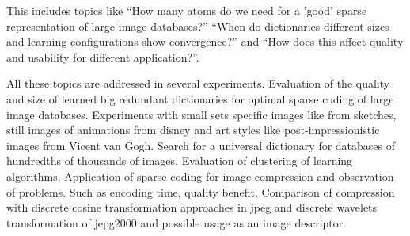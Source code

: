 This includes topics like ``How many atoms do we need  for a 'good' sparse representation of large image databases?'' 
``When do dictionaries different sizes and learning configurations show convergence?'' and ``How does this affect quality and usability for different application?''. 

All these topics are addressed in several experiments.
Evaluation of the quality and size of learned big redundant dictionaries for optimal sparse coding of large image databases.
Experiments with small sets specific images like from sketches, still images of animations from disney and art styles like post-impressionistic images from Vicent van Gogh.
Search for a universal dictionary for databases of hundredths of thousands of images.
Evaluation of clustering of learning algorithms. 
Application of sparse coding for image compression and observation of problems. Such as encoding time, quality benefit.
Comparison of compression with discrete cosine transformation approaches in jpeg and discrete wavelets transformation of jepg2000 and possible usage as an image descriptor.







